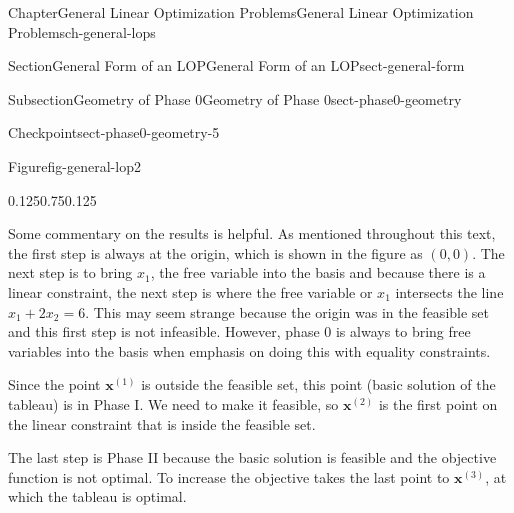 \documentclass[oneside,10pt,]{book}
\numberwithin{equation}{section}
\begin{document}
\begin{chapterptx}{Chapter}{General Linear Optimization Problems}{}{General Linear Optimization Problems}{}{}{ch-general-lops}
\begin{sectionptx}{Section}{General Form of an LOP}{}{General Form of an LOP}{}{}{sect-general-form}
\begin{subsectionptx}{Subsection}{Geometry of Phase 0}{}{Geometry of Phase 0}{}{}{sect-phase0-geometry}
\begin{inlineexercise}{Checkpoint}{}{sect-phase0-geometry-5}
\begin{figureptx}{Figure}{}{fig-general-lop2}{}
\begin{image}{0.125}{0.75}{0.125}{}
%
\end{image}%
\tcblower
\end{figureptx}%
Some commentary on the results is helpful. As mentioned throughout this text, the first step is always at the origin, which is shown in the figure as \((0,0)\). The next step is to bring \(x_1\), the free variable into the basis and because there is a linear constraint, the next step is where the free variable or \(x_1\) intersects the line \(x_1 + 2x_2 = 6\).  This may seem strange because the origin was in the feasible set and this first step is not infeasible.  However, phase 0 is always to bring free variables into the basis when emphasis on doing this with equality constraints.%
\par
Since the point \(\boldsymbol{x}^{(1)}\) is outside the feasible set, this point (basic solution of the tableau) is in Phase I. We need to make it feasible, so \(\boldsymbol{x}^{(2)}\) is the first point on the linear constraint that is inside the feasible set.%
\par
The last step is Phase II because the basic solution is feasible and the objective function is not optimal. To increase the objective takes the last point to \(\boldsymbol{x}^{(3)}\), at which the tableau is optimal.%
\end{inlineexercise}%
\end{subsectionptx}
\end{sectionptx}
%
%
\typeout{************************************************}

\end{chapterptx}
\end{document}
